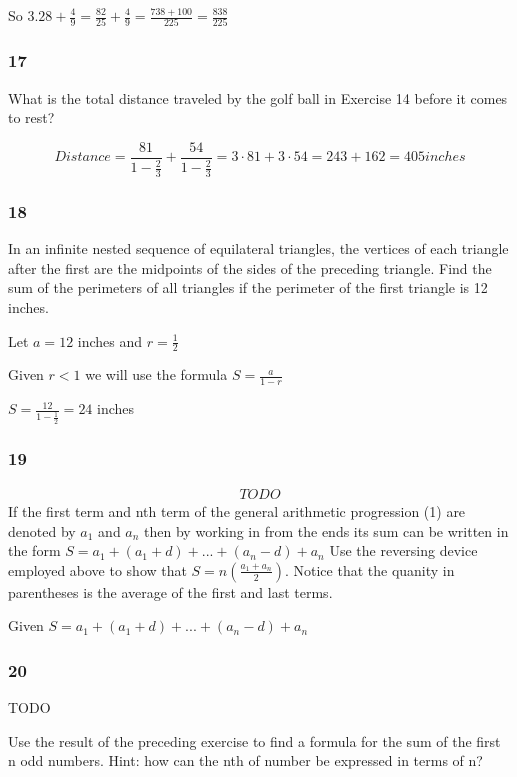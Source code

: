 \documentclass[]{report}
\begin{document}
So $3.28 + \frac{4}{9} = \frac{82}{25} + \frac{4}{9} = \frac{738+ 100}{225} = \frac{838}{225}$
\subsubsection{17}

What is the total distance traveled by the golf ball in Exercise 14 before it comes to rest?

\[
Distance = \frac{81}{1-\frac{2}{3}} + \frac{54}{1 - \frac{2}{3}} = 3 \cdot 81 + 3 \cdot 54 = 243 + 162 = 405 inches
\]

\subsubsection{18}

In an infinite nested sequence of equilateral triangles, the vertices of each triangle after the first are the midpoints of the sides of the preceding triangle. Find the sum of the perimeters of all triangles if the perimeter of the first triangle is 12 inches.

Let $a=12$ inches and $r = \frac{1}{2}$

Given $r < 1$ we will use the formula $S = \frac{a}{1-r}$

$S = \frac{12}{1 - \frac{1}{2}} = 24$ inches

\subsubsection{19}

\begin{align*}
TODO
\end{align*}
If the first term and nth term of the general arithmetic progression (1) are denoted by $a_1$ and $a_n$ then by working in from the ends its sum can be written in the form $S = a_1 + (a_1 + d) + ... + (a_n - d) + a_n$ Use the reversing device employed above to show that $S = n(\frac{a_1 + a_n}{2})$. Notice that the quanity in parentheses is the average of the first and last terms.

Given $S = a_1 + (a_1 + d) + ... + (a_n - d) + a_n$

\subsubsection{20}
TODO

Use the result of the preceding exercise to find a formula for the sum of the first n odd numbers. Hint: how can the nth of number be expressed in terms of n?
\end{document}

